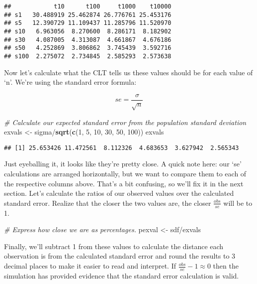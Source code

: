 \documentclass[]{article}
\newenvironment{Shaded}{\begin{snugshade}}{\end{snugshade}}
\newcommand{\KeywordTok}[1]{\textcolor[rgb]{0.13,0.29,0.53}{\textbf{{#1}}}}
\newcommand{\DecValTok}[1]{\textcolor[rgb]{0.00,0.00,0.81}{{#1}}}
\newcommand{\StringTok}[1]{\textcolor[rgb]{0.31,0.60,0.02}{{#1}}}
\newcommand{\CommentTok}[1]{\textcolor[rgb]{0.56,0.35,0.01}{\textit{{#1}}}}
\newcommand{\NormalTok}[1]{{#1}}
\begin{document}
\begin{verbatim}
##            t10      t100     t1000    t10000
## s1   30.488919 25.462874 26.776761 25.453176
## s5   12.390729 11.109437 11.285796 11.520970
## s10   6.963056  8.270600  8.286171  8.182902
## s30   4.087005  4.313087  4.661867  4.676186
## s50   4.252869  3.806862  3.745439  3.592716
## s100  2.275072  2.734845  2.585293  2.573638
\end{verbatim}

Now let's calculate what the CLT tells us these values should be for
each value of `n'. We're using the standard error formula:

\[
se = \frac{\sigma}{\sqrt{n}}
\]

\begin{Shaded}
\begin{Highlighting}[]
\CommentTok{# Calculate our expected standard error from the population standard deviation}
\NormalTok{exvals <-}\StringTok{  }\NormalTok{sigma/}\KeywordTok{sqrt}\NormalTok{(}\KeywordTok{c}\NormalTok{(}\DecValTok{1}\NormalTok{, }\DecValTok{5}\NormalTok{, }\DecValTok{10}\NormalTok{, }\DecValTok{30}\NormalTok{, }\DecValTok{50}\NormalTok{, }\DecValTok{100}\NormalTok{))}
\NormalTok{exvals}
\end{Highlighting}
\end{Shaded}

\begin{verbatim}
## [1] 25.653426 11.472561  8.112326  4.683653  3.627942  2.565343
\end{verbatim}

Just eyeballing it, it looks like they're pretty close. A quick note
here: our `se' calculations are arranged horizontally, but we want to
compare them to each of the respective columns above. That's a bit
confusing, so we'll fix it in the next section. Let's calculate the
ratios of our observed values over the calculated standard error.
Realize that the closer the two values are, the closer $\frac{obs}{se}$
will be to 1.

\begin{Shaded}
\begin{Highlighting}[]
\CommentTok{# Express how close we are as percentages.}
\NormalTok{pexval <-}\StringTok{ }\NormalTok{sdf/exvals}
\end{Highlighting}
\end{Shaded}

Finally, we'll subtract 1 from these values to calculate the distance
each observation is from the calculated standard error and round the
results to 3 decimal places to make it easier to read and interpret. If
$\frac{obs}{se} - 1 \approx 0$ then the simulation has provided evidence
that the standard error calculation is valid.
\end{document}
